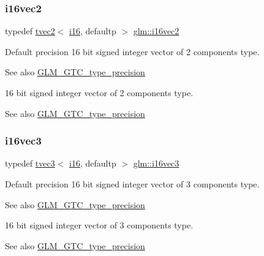 \subsubsection{\texorpdfstring{i16vec2}{i16vec2}}
{\footnotesize\ttfamily typedef \hyperlink{structglm_1_1tvec2}{tvec2}$<$ \hyperlink{group__gtc__type__precision_ga35e5542ca05b29cc256fdafb8503d1fd}{i16}, defaultp $>$ \hyperlink{group__gtc__type__precision_ga37af364ff13fb791571dd324dfd3ca89}{glm\+::i16vec2}}

Default precision 16 bit signed integer vector of 2 components type. \begin{DoxySeeAlso}{See also}
\hyperlink{group__gtc__type__precision}{G\+L\+M\+\_\+\+G\+T\+C\+\_\+type\+\_\+precision}
\end{DoxySeeAlso}
16 bit signed integer vector of 2 components type. \begin{DoxySeeAlso}{See also}
\hyperlink{group__gtc__type__precision}{G\+L\+M\+\_\+\+G\+T\+C\+\_\+type\+\_\+precision} 
\end{DoxySeeAlso}
\mbox{\label{group__gtc__type__precision_ga85e903f028d903b416a1119b00af57ea}} 
\subsubsection{\texorpdfstring{i16vec3}{i16vec3}}
{\footnotesize\ttfamily typedef \hyperlink{structglm_1_1tvec3}{tvec3}$<$ \hyperlink{group__gtc__type__precision_ga35e5542ca05b29cc256fdafb8503d1fd}{i16}, defaultp $>$ \hyperlink{group__gtc__type__precision_ga85e903f028d903b416a1119b00af57ea}{glm\+::i16vec3}}

Default precision 16 bit signed integer vector of 3 components type. \begin{DoxySeeAlso}{See also}
\hyperlink{group__gtc__type__precision}{G\+L\+M\+\_\+\+G\+T\+C\+\_\+type\+\_\+precision}
\end{DoxySeeAlso}
16 bit signed integer vector of 3 components type. \begin{DoxySeeAlso}{See also}
\hyperlink{group__gtc__type__precision}{G\+L\+M\+\_\+\+G\+T\+C\+\_\+type\+\_\+precision} 
\end{DoxySeeAlso}
\mbox{\label{group__gtc__type__precision_gaf074450c0e60b45114084b1df4012a1d}} 
